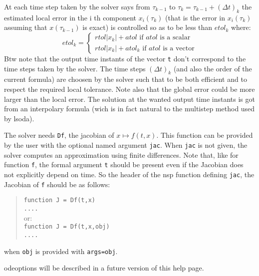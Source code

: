 \begin{mandescription}
At each time step taken by the solver says from $\tau_{k-1}$ to  $\tau_k = \tau_{k-1} + (\Delta t)_k$
the estimated local error in the i th component $x_i(\tau_k)$ (that is the error in 
$x_i(\tau_k)$ assuming that $x(\tau_{k-1})$ is exact) is controlled so as to be less 
than $etol_k$ where:
$$
etol_k =
\left\{
\begin{array}{l}
 rtol | x_k | + atol  \mbox{ if } atol \mbox { is a scalar} \\
 rtol | x_k | + atol_k  \mbox{ if } atol \mbox { is a vector}
\end{array}
\right.
$$
 Btw note that the output time instants  of the vector \verb+t+ don't correspond 
to the time steps taken by the solver. The  time steps $(\Delta t)_k$
(and also the order of the current formula) are choosen by the solver such 
that to be both efficient and to respect the required local tolerance. Note 
also that the global error could be more larger than the local error. The 
solution at the wanted output time instants is got from an interpolary 
formula (wich is in fact natural to the multistep method used by lsoda).

 The solver needs \verb+Df+, the jacobian
of $x \mapsto f(t,x)$.  This function can be provided by the user
with the optional named argument \verb+jac+. When \verb+jac+ is not given,
the solver computes an approximation using finite differences. Note that, like
for function \verb+f+, the formal argument \verb+t+ should be present even if
the Jacobian does not explicitly depend on time. So the header of
the nsp function defining \verb+jac+, the Jacobian of \verb+f+ should be as follows:
\begin{quote}
{\tt function J = Df(t,x) \\
      ....}\\
or:\\
{\tt function J = Df(t,x,obj) \\
     ....}
\end{quote}
when {\tt obj} is provided with {\tt args=obj}.

odeoptions will be described in a future version of this help page.

\end{mandescription} 

